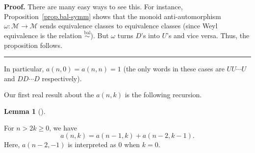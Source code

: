 \documentclass[numbers=enddot,12pt,final,onecolumn,notitlepage]{scrartcl}%
\theoremstyle{definition}
\newtheorem{lem}[theo]{Lemma}
\newenvironment{lemma}[1][]
{\begin{lem}[#1]\begin{leftbar}}
{\end{leftbar}\end{lem}}
\newenvironment{proof}[1][Proof]{\noindent\textbf{#1.} }{\ \rule{0.5em}{0.5em}}
\newcommand{\M}{\mathcal{M}}
\newcommand{\balsim}{\overset{\operatorname*{bal}}{\sim}}
\begin{document}
\begin{proof}
There are many easy ways to see this.
For instance, Proposition~\ref{prop.bal-symm} shows that the monoid anti-automorphism $\omega : \M \to \M$ sends equivalence classes to equivalence classes (since Weyl equivalence is the relation $\balsim$).
But $\omega$ turns $D$'s into $U$'s and vice versa.
Thus, the proposition follows.
\end{proof}

In particular, $a(n,0) = a(n,n) = 1$ (the only words in these cases are $UU\cdots U$ and $DD\cdots D$ respectively).
\medskip

Our first real result about the $a(n,k)$ is the following recursion.

\begin{lemma}
\label{lemma:recursion}
For $n > 2k \geq 0$, we have
\[a(n, k) = a(n-1, k) + a(n-2, k-1).\]
Here, $a(n-2,-1)$ is interpreted as $0$ when $k=0$.
\end{lemma}
\end{document}
